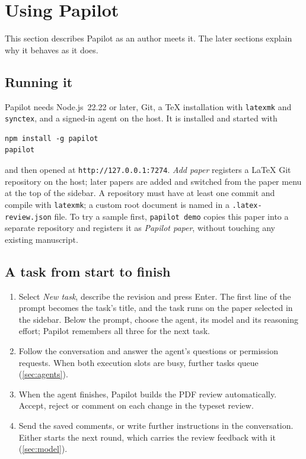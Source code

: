 \section{Using Papilot}
\label{sec:using}

This section describes Papilot as an author meets it. The later sections
explain why it behaves as it does.

\subsection{Running it}

Papilot needs Node.js~22.22 or later, Git, a \TeX{} installation with
\texttt{latexmk} and \texttt{synctex}, and a signed-in agent on the host. It is
installed and started with
\begin{verbatim}
npm install -g papilot
papilot
\end{verbatim}
and then opened at \texttt{http://127.0.0.1:7274}. \emph{Add paper} registers a
\LaTeX{} Git repository on the host; later papers are added and switched from
the paper menu at the top of the sidebar. A repository must have at least one
commit and compile with \texttt{latexmk}; a custom root document is named in a
\texttt{.latex-review.json} file. To try a sample first, \texttt{papilot demo}
copies this paper into a separate repository and registers it as
\emph{Papilot paper}, without touching any existing manuscript.

\subsection{A task from start to finish}

\begin{enumerate}
  \item Select \emph{New task}, describe the revision and press Enter. The first
    line of the prompt becomes the task's title, and the task runs on the paper
    selected in the sidebar. Below the prompt, choose the agent, its model and
    its reasoning effort; Papilot remembers all three for the next task.
  \item Follow the conversation and answer the agent's questions or permission
    requests. When both execution slots are busy, further tasks queue
    (\cref{sec:agents}).
  \item When the agent finishes, Papilot builds the PDF review automatically.
    Accept, reject or comment on each change in the typeset review.
  \item Send the saved comments, or write further instructions in the
    conversation. Either starts the next round, which carries the review
    feedback with it (\cref{sec:model}).
\end{enumerate}

